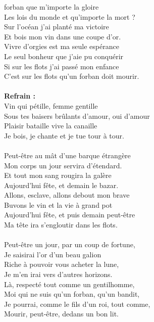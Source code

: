 
 forban que m'importe la gloire
\\Les lois du monde et qu'importe la mort ?
\\Sur l'océan j'ai planté ma victoire
\\Et bois mon vin dans une coupe d'or.
\\Vivre d'orgies est ma seule espérance
\\Le seul bonheur que j'aie pu conquérir
\\Si sur les flots j'ai passé mon enfance
\\C'est sur les flots qu'un forban doit mourir.
\\\\\textbf{Refrain :}
\\Vin qui pétille, femme gentille
\\Sous tes baisers brûlants d'amour, oui d'amour
\\Plaisir bataille vive la canaille
\\Je bois, je chante et je tue tour à tour.
\\\\Peut-être au mât d'une barque étrangère
\\Mon corps un jour servira d'étendard.
\\Et tout mon sang rougira la galère
\\Aujourd'hui fête, et demain le bazar.
\\Allons, esclave, allons debout mon brave
\\Buvons le vin et la vie à grand pot
\\Aujourd'hui fête, et puis demain peut-être
\\Ma tête ira s'engloutir dans les flots.
\\\\Peut-être un jour, par un coup de fortune,
\\Je saisirai l'or d'un beau galion
\\Riche à pouvoir vous acheter la lune,
\\Je m'en irai vers d'autres horizons.
\\Là, respecté tout comme un gentilhomme,
\\Moi qui ne suis qu'un forban, qu'un bandit,
\\Je pourrai, comme le fils d'un roi, tout comme,
\\Mourir, peut-être, dedans un bon lit.


\breakpage